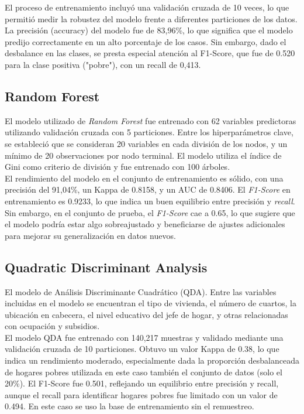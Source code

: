 \documentclass[a4paper]{article}
\theoremstyle{remark}
\theoremstyle{definition}
\begin{document}
El proceso de entrenamiento incluyó una validación cruzada de 10 veces, lo que permitió medir la robustez del modelo frente a diferentes particiones de los datos. La precisión (accuracy) del modelo fue de 83,96\%, lo que significa que el modelo predijo correctamente en un alto porcentaje de los casos. Sin embargo, dado el desbalance en las clases, se presta especial atención al F1-Score, que fue de 0.520 para la clase positiva ("pobre"), con un recall de 0,413.




\subsection{Random Forest}

El modelo utilizado de \textit{Random Forest} fue entrenado con 62 variables predictoras utilizando validación cruzada con 5 particiones. Entre los hiperparámetros clave, se estableció que se consideran 20 variables en cada división de los nodos, y un mínimo de 20 observaciones por nodo terminal. El modelo utiliza el índice de Gini como criterio de división y fue entrenado con 100 árboles. \\

El rendimiento del modelo en el conjunto de entrenamiento es sólido, con una precisión del 91,04\%, un Kappa de 0.8158, y un AUC de 0.8406. El \textit{F1-Score} en entrenamiento es 0.9233, lo que indica un buen equilibrio entre precisión y \textit{recall}. Sin embargo, en el conjunto de prueba, el \textit{F1-Score} cae a 0.65, lo que sugiere que el modelo podría estar algo sobreajustado y beneficiarse de ajustes adicionales para mejorar su generalización en datos nuevos.


\subsection{Quadratic Discriminant Analysis}

El modelo de Análisis Discriminante Cuadrático (QDA). Entre las variables incluidas en el modelo se encuentran el tipo de vivienda, el número de cuartos, la ubicación en cabecera, el nivel educativo del jefe de hogar, y otras relacionadas con ocupación y subsidios. \\

El modelo QDA fue entrenado con 140,217 muestras y validado mediante una validación cruzada de 10 particiones. Obtuvo un valor Kappa de 0.38, lo que indica un rendimiento moderado, especialmente dada la proporción desbalanceada de hogares pobres utilizada en este caso también el conjunto de datos (solo el 20\%). El F1-Score fue 0.501, reflejando un equilibrio entre precisión y recall, aunque el recall para identificar hogares pobres fue limitado con un valor de 0.494. En este caso se uso la base de entrenamiento sin el remuestreo.
\end{document}
